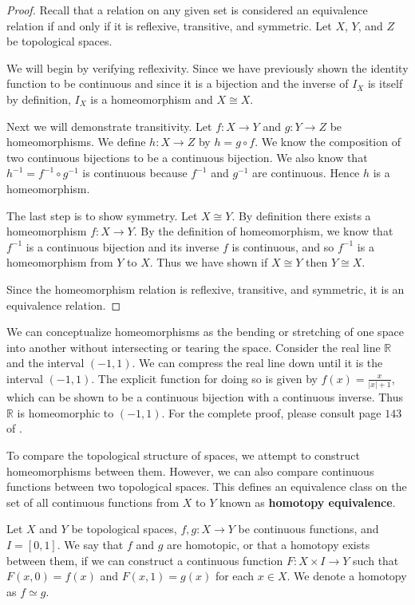 \documentclass[12pt,oneside]{amsbook}
\newenvironment{defn}[1][Definition.]{\begin{trivlist}
\item[\hskip \labelsep {\bfseries #1}]}{\end{trivlist}}
\newcommand{\R}{\mathbb{R}}
\begin{document}
\begin{proof}
Recall that a relation on any given set is considered an equivalence relation if and only if it is reflexive, transitive, and symmetric. Let $X$, $Y$, and $Z$ be topological spaces.

We will begin by verifying reflexivity. Since we have previously shown the identity function to be continuous and since it is a bijection and the inverse of $I_X$ is itself by definition, $I_X$ is a homeomorphism and $X\cong X$. 

Next we will demonstrate transitivity. Let  $f\colon X\rightarrow Y $ and $g\colon Y\rightarrow Z$ be homeomorphisms. We define $h\colon X\rightarrow Z$ by $h=g\circ f$. We know the composition of two continuous bijections to be a continuous bijection. We also know that $h^{-1}=f^{-1}\circ g^{-1}$ is continuous because $f^{-1}$ and $g^{-1}$ are continuous. Hence $h$ is a homeomorphism.

The last step is to show symmetry. Let $X\cong Y$. By definition there exists a homeomorphism $f\colon X \rightarrow Y$. By the definition of homeomorphism, we know that $f^{-1}$ is a continuous bijection and its inverse $f$ is continuous, and so $f^{-1}$ is a homeomorphism from $Y$ to $X$. Thus we have shown if $X\cong Y$ then $Y\cong X$.

Since the homeomorphism relation is reflexive, transitive, and symmetric, it is an equivalence relation.
\end{proof}

We can conceptualize homeomorphisms as the bending or stretching of one space into another without intersecting or tearing the space. Consider the real line $\R$ and the interval $(-1,1)$. We can compress the real line down until it is the interval $(-1,1)$. The explicit function for doing so is given by $f(x)=\frac{x}{|x|+1}$, which can be shown to be a continuous bijection with a continuous inverse. Thus $\R$ is homeomorphic to $(-1,1)$. For the complete proof, please consult page $143$ of \cite{factory}. 

To compare the topological structure of spaces, we attempt to construct homeomorphisms between them. However, we can also compare continuous functions between two topological spaces. This defines an equivalence class on the set of all continuous functions from $X$ to $Y$ known as \textbf{homotopy equivalence}.


\begin{defn}
Let $X$ and $Y$ be topological spaces, $f,g\colon X \rightarrow Y$ be continuous functions, and $I=[0,1]$. We say that $f$ and $g$ are homotopic, or that a homotopy exists between them, if we can construct a continuous function $F\colon X \times I \rightarrow Y$ such that $F(x,0)=f(x)$ and $F(x,1)=g(x)$ for each $x \in X$. We denote a homotopy as $f \simeq g$.
\end{defn}
\end{document}
